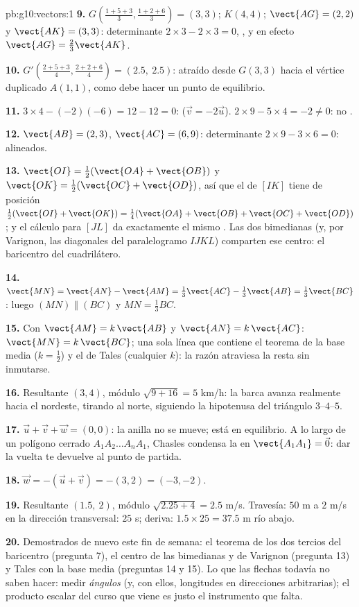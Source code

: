 \begin{solution}{pb:g10:vectors:1}
\textbf{9.} $G\left(\frac{1+5+3}{3}, \frac{1+2+6}{3}\right) = (3, 3)$;
$K(4, 4)$; $\vect{AG} = (2, 2)$ y $\vect{AK} = (3, 3)$: determinante
$2 \times 3 - 2 \times 3 = 0$, , y en efecto
$\vect{AG} = \frac23\vect{AK}$.

\textbf{10.} $G'\left(\frac{2 + 5 + 3}{4}, \frac{2 + 2 + 6}{4}\right) =
(2.5,\ 2.5)$: atraído desde $G(3,3)$ hacia el vértice duplicado $A(1,1)$,
como debe hacer un punto de equilibrio.

\textbf{11.} $3 \times 4 - (-2)(-6) = 12 - 12 = 0$: 
($\vec v = -2\vec u$). $2 \times 9 - 5 \times 4 = -2 \neq 0$: no
.

\textbf{12.} $\vect{AB} = (2, 3)$, $\vect{AC} = (6, 9)$: determinante
$2 \times 9 - 3 \times 6 = 0$: alineados.

\textbf{13.} $\vect{OI} = \frac12(\vect{OA} + \vect{OB})$ y
$\vect{OK} = \frac12(\vect{OC} + \vect{OD})$, así que el  de
$[IK]$ tiene  de posición
$\frac12(\vect{OI} + \vect{OK}) = \frac14(\vect{OA} + \vect{OB} +
\vect{OC} + \vect{OD})$; y el cálculo para $[JL]$ da exactamente el mismo
. Las dos bimedianas (y, por Varignon, las diagonales del
paralelogramo $IJKL$) comparten ese centro: el baricentro del
cuadrilátero.

\textbf{14.} $\vect{MN} = \vect{AN} - \vect{AM} =
\frac13\vect{AC} - \frac13\vect{AB} = \frac13\vect{BC}$: luego
$(MN) \parallel (BC)$ y $MN = \frac13 BC$.

\textbf{15.} Con $\vect{AM} = k\,\vect{AB}$ y $\vect{AN} = k\,\vect{AC}$:
$\vect{MN} = k\,\vect{BC}$; una sola línea que contiene el teorema de la
base media ($k = \frac12$) y el de Tales (cualquier $k$): la razón
atraviesa la resta sin inmutarse.

\textbf{16.} Resultante $(3, 4)$, módulo $\sqrt{9 + 16} = 5$ km/h: la
barca avanza realmente hacia el nordeste, tirando al norte, siguiendo la
hipotenusa del triángulo $3$--$4$--$5$.

\textbf{17.} $\vec u + \vec v + \vec w = (0, 0)$: la anilla no se mueve;
está en equilibrio. A lo largo de un polígono cerrado
$A_1 A_2 \dots A_n A_1$, Chasles condensa la  en
$\vect{A_1 A_1} = \vec 0$: dar la vuelta te devuelve al punto de partida.

\textbf{18.} $\vec w = -(\vec u + \vec v) = -(3, 2) = (-3, -2)$.

\textbf{19.} Resultante $(1.5,\ 2)$, módulo $\sqrt{2.25 + 4} = 2.5$ m/s.
Travesía: $50$ m a $2$ m/s en la dirección transversal: $25$ s; deriva:
$1.5 \times 25 = 37.5$ m río abajo.

\textbf{20.} Demostrados de nuevo este fin de semana: el teorema de los
dos tercios del baricentro (pregunta 7), el centro de las bimedianas y de
Varignon (pregunta 13) y Tales con la base media (preguntas 14 y 15). Lo
que las flechas todavía no saben hacer: medir \emph{ángulos} (y, con
ellos, longitudes en direcciones arbitrarias); el producto escalar del
curso que viene es justo el instrumento que falta.
\end{solution}
